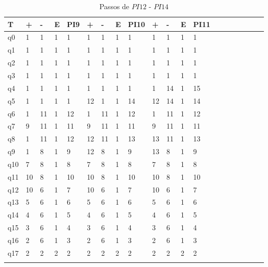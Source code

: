 \documentclass[12pt,a4paper]{report}
\begin{document}
\begin{table}[ht]
\caption{\label{tab:table-name} Passos de $PI12$ - $PI14$}
\centering
\begin{tabular}{ l l l l l l l l l l l l l l l l l l l l }
\hline
\hline
T      & +  & -  & E & PI9 & +  & -  & E & PI10 & +  & -  & E & PI11 &  &  &  &  &  &  &  \\ \hline
q0  & 1  & 1  & 1 & 1   & 1  & 1  & 1 & 1    & 1  & 1  & 1 & 1    &  &  &  &  &  &  &  \\
q1  & 1  & 1  & 1 & 1   & 1  & 1  & 1 & 1    & 1  & 1  & 1 & 1    &  &  &  &  &  &  &  \\
q2  & 1  & 1  & 1 & 1   & 1  & 1  & 1 & 1    & 1  & 1  & 1 & 1    &  &  &  &  &  &  &  \\
q3  & 1  & 1  & 1 & 1   & 1  & 1  & 1 & 1    & 1  & 1  & 1 & 1    &  &  &  &  &  &  &  \\
q4  & 1  & 1  & 1 & 1   & 1  & 1  & 1 & 1    & 1  & 14 & 1 & 15   &  &  &  &  &  &  &  \\
q5  & 1  & 1  & 1 & 1   & 12 & 1  & 1 & 14   & 12 & 14 & 1 & 14   &  &  &  &  &  &  &  \\
q6  & 1  & 11 & 1 & 12  & 1  & 11 & 1 & 12   & 1  & 11 & 1 & 12   &  &  &  &  &  &  &  \\
q7  & 9  & 11 & 1 & 11  & 9  & 11 & 1 & 11   & 9  & 11 & 1 & 11   &  &  &  &  &  &  &  \\
q8  & 1  & 11 & 1 & 12  & 12 & 11 & 1 & 13   & 13 & 11 & 1 & 13   &  &  &  &  &  &  &  \\
q9  & 1  & 8  & 1 & 9   & 12 & 8  & 1 & 9    & 13 & 8  & 1 & 9    &  &  &  &  &  &  &  \\
q10 & 7  & 8  & 1 & 8   & 7  & 8  & 1 & 8    & 7  & 8  & 1 & 8    &  &  &  &  &  &  &  \\
q11 & 10 & 8  & 1 & 10  & 10 & 8  & 1 & 10   & 10 & 8  & 1 & 10   &  &  &  &  &  &  &  \\
q12 & 10 & 6  & 1 & 7   & 10 & 6  & 1 & 7    & 10 & 6  & 1 & 7    &  &  &  &  &  &  &  \\
q13 & 5  & 6  & 1 & 6   & 5  & 6  & 1 & 6    & 5  & 6  & 1 & 6    &  &  &  &  &  &  &  \\
q14 & 4  & 6  & 1 & 5   & 4  & 6  & 1 & 5    & 4  & 6  & 1 & 5    &  &  &  &  &  &  &  \\
q15 & 3  & 6  & 1 & 4   & 3  & 6  & 1 & 4    & 3  & 6  & 1 & 4    &  &  &  &  &  &  &  \\
q16 & 2  & 6  & 1 & 3   & 2  & 6  & 1 & 3    & 2  & 6  & 1 & 3    &  &  &  &  &  &  &  \\
q17 & 2  & 2  & 2 & 2   & 2  & 2  & 2 & 2    & 2  & 2  & 2 & 2    &  &  &  &  &  &  &  \\
       &    &    &   &     &    &    &   &      &    &    &   &      &  &  &  &  &  &  & \\
       \hline
\end{tabular}
\end{table}
\end{document}
